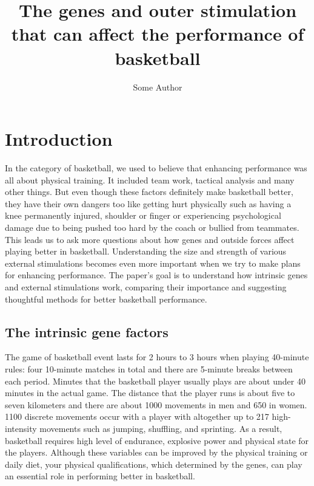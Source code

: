\documentclass[man,floatsintext]{apa7}
\title{The genes and outer stimulation that can affect the performance of basketball}
\author{Some Author}
\begin{document}
\maketitle
\tableofcontents
\newpage


\section{Introduction}


In the category of basketball, we used to believe that enhancing performance was all about physical training. It included team work, tactical analysis and many other things. But even though these factors definitely make basketball better, they have their own dangers too like getting hurt physically such as having a knee permanently injured, shoulder or finger or experiencing psychological damage due to being pushed too hard by the coach or bullied from teammates. This leads us to ask more questions about how genes and outside forces affect playing better in basketball. Understanding the size and strength of various external stimulations becomes even more important when we try to make plans for enhancing performance. The paper's goal is to understand how intrinsic genes and external stimulations work, comparing their importance and suggesting thoughtful methods for better basketball performance. 


\subsection{The intrinsic gene factors}
The game of basketball event lasts for 2 hours to 3 hours when playing 40-minute rules: four 10-minute matches in total and there are 5-minute breaks between each period. Minutes that the basketball player usually plays are about under 40 minutes in the actual game. The distance that the player runs is about five to seven kilometers and there are about 1000 movements in men and 650 in women. 1100 discrete movements occur with a player with altogether up to 217 high-intensity movements such as jumping, shuffling, and sprinting.\autocite[13-14]{raduScienceBasketball2018} As a result, basketball requires high level of endurance, explosive power and physical state for the players. Although these variables can be improved by the physical training or daily diet, your physical qualifications, which determined by the genes, can play an essential role in performing better in basketball.
\end{document}
